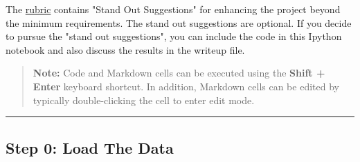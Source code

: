 \documentclass[11pt]{article}
\begin{document}
The \href{https://review.udacity.com/\#!/rubrics/481/view}{rubric}
contains "Stand Out Suggestions" for enhancing the project beyond the
minimum requirements. The stand out suggestions are optional. If you
decide to pursue the "stand out suggestions", you can include the code
in this Ipython notebook and also discuss the results in the writeup
file.

\begin{quote}
\textbf{Note:} Code and Markdown cells can be executed using the
\textbf{Shift + Enter} keyboard shortcut. In addition, Markdown cells
can be edited by typically double-clicking the cell to enter edit mode.
\end{quote}

    \begin{center}\rule{0.5\linewidth}{\linethickness}\end{center}

\subsection{Step 0: Load The Data}\label{step-0-load-the-data}
\end{document}
